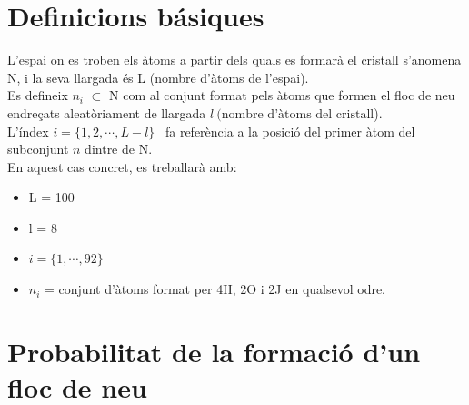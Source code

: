 \documentclass[12pt]{report}
\begin{document}
\section{Definicions básiques}
L'espai on es troben els àtoms a partir dels quals es formarà el cristall s'anomena N, i la seva llargada és L (nombre d'àtoms de l'espai).\\
Es defineix \textbf{$n_{i}$} $\subset$ N com al conjunt format pels àtoms que formen el floc de neu endreçats aleatòriament de llargada $l \ ( \text{nombre d'àtoms del cristall}$). \\
L'índex $\textit{i} = \{1, 2, \cdots , L - \textit{l}\}$ \ fa referència a la posició del primer àtom del subconjunt $n$ dintre de N. \\
En aquest cas concret, es treballarà amb:
\begin{itemize}
    \item L = 100
    \item l = 8
    \item $\textit{i} = \{1, \cdots ,  92\}$ 
    \item \textbf{$n_{i}$} = conjunt d'àtoms format per  4H, 2O i 2J en qualsevol odre.
\end{itemize}


\newpage
\section{Probabilitat de la formació d'un floc de neu}
\end{document}
